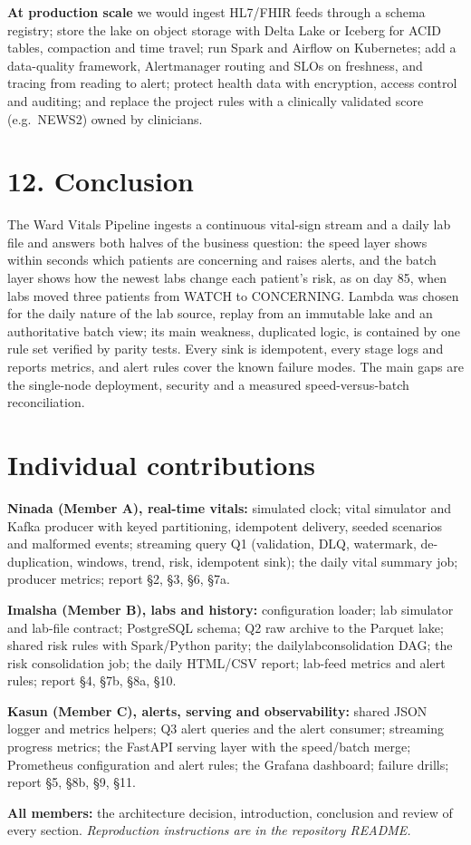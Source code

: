 \documentclass[11pt,a4paper]{article}
\newcommand{\ubreak}{\textunderscore\allowbreak}
\newcommand{\code}[1]{{\small\ttfamily\let\_\ubreak #1}}
\begin{document}
\textbf{At production scale} we would ingest HL7/FHIR feeds through a schema registry; store the lake on object
storage with Delta Lake or Iceberg for ACID tables, compaction and time travel; run Spark and Airflow on Kubernetes;
add a data-quality framework, Alertmanager routing and SLOs on freshness, and tracing from reading to alert; protect
health data with encryption, access control and auditing; and replace the project rules with a clinically validated
score (e.g.\ NEWS2) owned by clinicians.

\section{12. Conclusion}
The Ward Vitals Pipeline ingests a continuous vital-sign stream and a daily lab file and answers both halves of the
business question: the speed layer shows within seconds which patients are concerning and raises alerts, and the
batch layer shows how the newest labs change each patient's risk, as on day 85, when labs moved three patients from
WATCH to CONCERNING. Lambda was chosen for the daily nature of the lab source, replay from an immutable lake and an
authoritative batch view; its main weakness, duplicated logic, is contained by one rule set verified by parity
tests. Every sink is idempotent, every stage logs and reports metrics, and alert rules cover the known failure
modes. The main gaps are the single-node deployment, security and a measured speed-versus-batch reconciliation.

\section{Individual contributions}
\textbf{Ninada (Member A), real-time vitals:} simulated clock; vital simulator and Kafka producer with keyed
partitioning, idempotent delivery, seeded scenarios and malformed events; streaming query Q1 (validation, DLQ,
watermark, de-duplication, windows, trend, risk, idempotent sink); the daily vital summary job; producer metrics;
report \S2, \S3, \S6, \S7a.

\textbf{Imalsha (Member B), labs and history:} configuration loader; lab simulator and lab-file contract; PostgreSQL
schema; Q2 raw archive to the Parquet lake; shared risk rules with Spark/Python parity; the
\code{daily\_lab\_consolidation} DAG; the risk consolidation job; the daily HTML/CSV report; lab-feed metrics and
alert rules; report \S4, \S7b, \S8a, \S10.

\textbf{Kasun (Member C), alerts, serving and observability:} shared JSON logger and metrics helpers; Q3 alert
queries and the alert consumer; streaming progress metrics; the FastAPI serving layer with the speed/batch merge;
Prometheus configuration and alert rules; the Grafana dashboard; failure drills; report \S5, \S8b, \S9, \S11.

\textbf{All members:} the architecture decision, introduction, conclusion and review of every section.
\emph{Reproduction instructions are in the repository README.}
\end{document}
